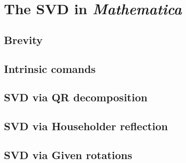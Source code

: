 \section{The SVD in \textit{Mathematica}}

\subsection{Brevity}

\subsection{Intrinsic comands}

\subsection{SVD via QR decomposition}

\subsection{SVD via Householder reflection}

\subsection{SVD via Given rotations}


\endinput